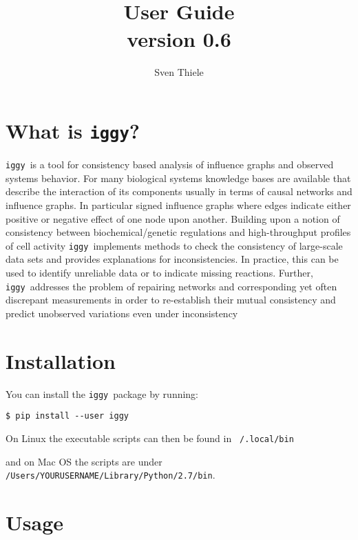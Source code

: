 \documentclass{article}
\title{ \iggy  \\
User Guide \\
version 0.6
}
\author{Sven Thiele}
\date{}
\newcommand\iggy{\texttt{iggy}}
\begin{document}
\maketitle


\section{What is \iggy?}

\iggy\ is a tool for consistency based analysis of influence graphs and observed systems behavior.
For many biological systems knowledge bases are available that describe the interaction of its components 
 usually in terms of causal networks and influence graphs. 
In particular signed influence graphs where edges indicate either positive or negative effect of one node upon another.
Building upon a notion of consistency between biochemical/genetic regulations and high-throughput profiles of cell activity
\iggy\ implements methods to check the consistency of large-scale data sets and
 provides explanations for inconsistencies. 
In practice, this can be used to identify unreliable data or to indicate missing reactions. 
Further, \iggy\ addresses the problem of repairing networks and corresponding yet often discrepant measurements
in order to re-establish their mutual consistency and predict unobserved variations even under inconsistency
 
 
\section{Installation}

You can install the \iggy\ package by running:

\begin{Verbatim}[frame=single]
$ pip install --user iggy
\end{Verbatim} 


On Linux the executable scripts can then be found in \texttt{~/.local/bin}

and on Mac OS the scripts are under \texttt{/Users/YOURUSERNAME/Library/Python/2.7/bin}.



\section{Usage}
\end{document}
